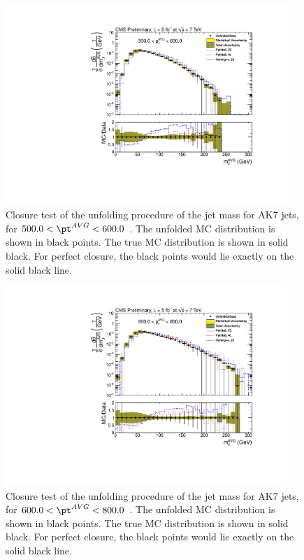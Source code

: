\begin{figure}[htbp]
\centering
\includegraphics[width=0.95\textwidth]{figs/unfoldedMeasurementDijets_7_closuretest}
\caption{Closure test of the unfolding procedure of the jet mass for AK7 jets,
for $500.0 < \pt^{AVG} < 600.0$ \GeVc. The unfolded MC distribution is shown in black points.
The true MC distribution is shown in solid black. For perfect closure, the black points would
lie exactly on the solid black line.  
\label{figs:unfoldedMeasurementDijets_7_closuretest}}
\end{figure}



\begin{figure}[htbp]
\centering
\includegraphics[width=0.95\textwidth]{figs/unfoldedMeasurementDijets_8_closuretest}
\caption{Closure test of the unfolding procedure of the jet mass for AK7 jets,
for $600.0 < \pt^{AVG} < 800.0$ \GeVc. The unfolded MC distribution is shown in black points.
The true MC distribution is shown in solid black. For perfect closure, the black points would
lie exactly on the solid black line.  
\label{figs:unfoldedMeasurementDijets_8_closuretest}}
\end{figure}



